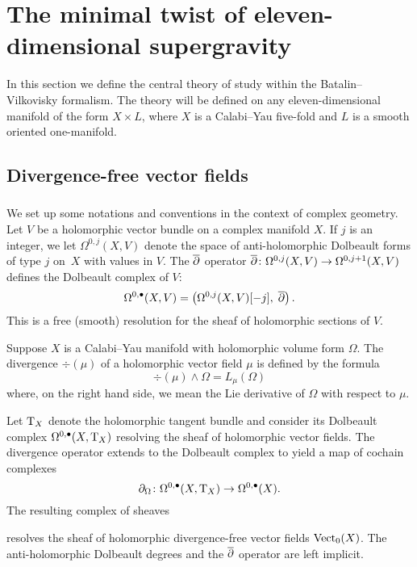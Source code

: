 \section{The minimal twist of eleven-dimensional supergravity} 
\label{s:dfn}

In this section we define the central theory of study within the Batalin--Vilkovisky formalism.
The theory will be defined on any eleven-dimensional manifold of the form $X \times L$, where $X$ is a Calabi--Yau five-fold and $L$ is a smooth oriented one-manifold.

\subsection{Divergence-free vector fields} 

\subsubsection{}
\label{sec:divfree}
We set up some notations and conventions in the context of complex geometry. 
Let $V$ be a holomorphic vector bundle on a complex manifold $X$. 
If $j$ is an integer, we let $\Omega^{0,j}(X, V)$ denote the space of anti-holomorphic Dolbeault forms of type $j$ on~$X$ with values in $V$.
The $\overline{\partial}$ operator $\overline{\partial} \colon \Omega^{0,j}(X, V)\to \Omega^{0,j+1}(X,V)$ defines the Dolbeault complex of $V$:
\[
  \Omega^{0,\bullet}(X, V) = \left(\Omega^{0,j}(X, V)[-j] , \; \overline{\partial}\right) .
\]
This is a free (smooth) resolution for the sheaf of holomorphic sections of $V$.

Suppose $X$ is a Calabi--Yau manifold with holomorphic volume form $\Omega$.
The divergence $\div(\mu)$ of a holomorphic vector field $\mu$ is defined by the formula
\[
\div (\mu) \wedge \Omega = L_\mu (\Omega)
\]
where, on the right hand side, we mean the Lie derivative of $\Omega$ with respect to $\mu$.

Let ${\rm T}_X$ denote the holomorphic tangent bundle and consider its Dolbeault complex $\Omega^{0,\bullet}(X , {\rm T}_X)$ resolving the sheaf of holomorphic vector fields. 
The divergence operator extends to the Dolbeault complex to yield a map of cochain complexes 
\[
\partial_{\Omega} \colon \Omega^{0,\bullet}(X , {\rm T}_X) \to \Omega^{0,\bullet}(X) .
\]
The resulting complex of sheaves
\beqn\label{eqn:cplx1}
\eeqn
resolves the sheaf of holomorphic divergence-free vector fields ${\rm Vect}_0 (X)$.
The anti-holomorphic Dolbeault degrees and the $\overline{\partial}$ operator are left implicit. 

